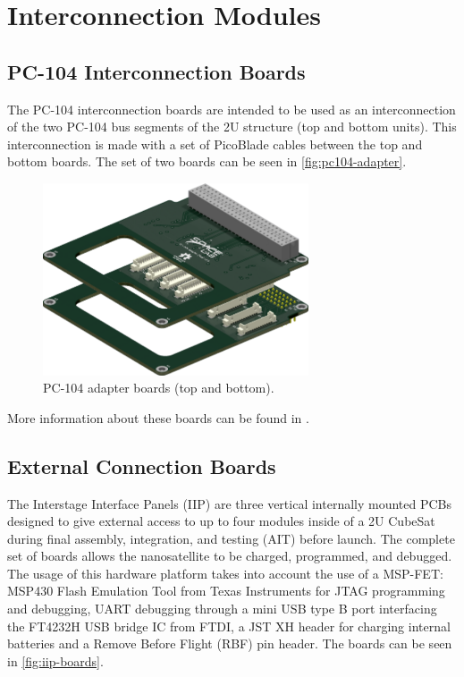 \section{Interconnection Modules}

\subsection{PC-104 Interconnection Boards}

The PC-104 interconnection boards are intended to be used as an interconnection of the two PC-104 bus segments of the 2U structure (top and bottom units). This interconnection is made with a set of PicoBlade cables between the top and bottom boards. The set of two boards can be seen in \autoref{fig:pc104-adapter}.

\begin{figure}[!ht]
    \begin{center}
        \includegraphics[width=0.7\textwidth]{figures/pc104-adapter}
        \caption{PC-104 adapter boards (top and bottom).}
        \label{fig:pc104-adapter}
    \end{center}
\end{figure}

More information about these boards can be found in \cite{pc104-boards}.

\subsection{External Connection Boards}

The Interstage Interface Panels (IIP) are three vertical internally mounted PCBs designed to give external access to up to four modules inside of a 2U CubeSat during final assembly, integration, and testing (AIT) before launch. The complete set of boards allows the nanosatellite to be charged, programmed, and debugged. The usage of this hardware platform takes into account the use of a MSP-FET: MSP430 Flash Emulation Tool from Texas Instruments for JTAG programming and debugging, UART debugging through a mini USB type B port interfacing the FT4232H USB bridge IC from FTDI, a JST XH header for charging internal batteries and a Remove Before Flight (RBF) pin header. The boards can be seen in \autoref{fig:iip-boards}.

